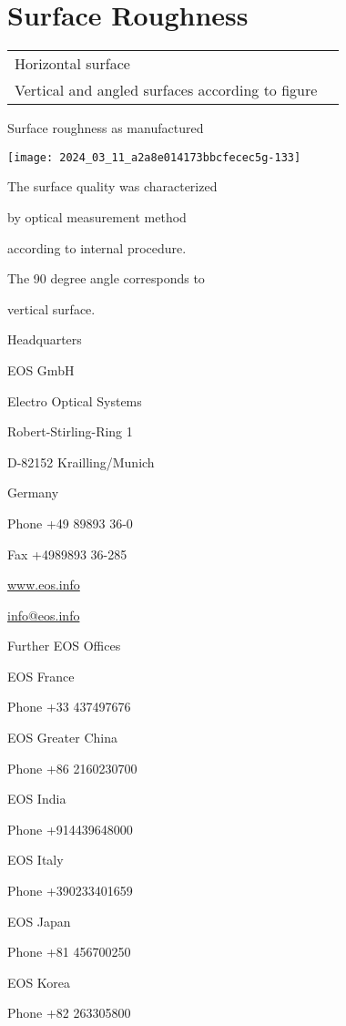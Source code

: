 \documentclass[10pt]{article}
\begin{document}
\section*{Surface Roughness}
\begin{center}
\begin{tabular}{ll}
\hline
Horizontal surface \\
Vertical and angled surfaces according to figure \\
\hline
\end{tabular}
\end{center}

Surface roughness as manufactured

\begin{center}
\texttt{[image: 2024\_03\_11\_a2a8e014173bbcfecec5g-133]}
\end{center}

The surface quality was characterized

by optical measurement method

according to internal procedure.

The 90 degree angle corresponds to

vertical surface.

Headquarters

EOS GmbH

Electro Optical Systems

Robert-Stirling-Ring 1

D-82152 Krailling/Munich

Germany

Phone +49 89893 36-0

Fax +4989893 36-285

\href{http://www.eos.info}{www.eos.info}

\href{mailto:info@eos.info}{info@eos.info}

Further EOS Offices

EOS France

Phone +33 437497676

EOS Greater China

Phone +86 2160230700

EOS India

Phone +914439648000

EOS Italy

Phone +390233401659

EOS Japan

Phone +81 456700250

EOS Korea

Phone +82 263305800
\end{document}
